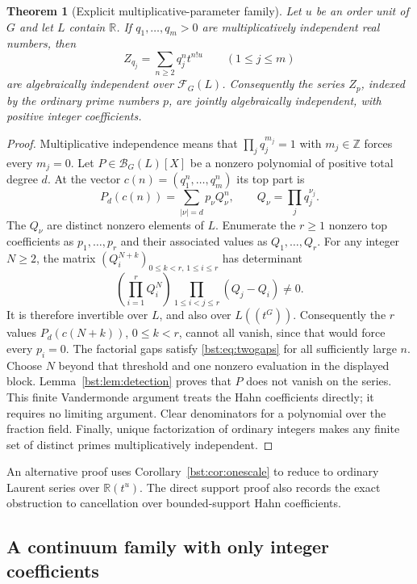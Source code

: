 \documentclass[11pt,letterpaper]{article}
\newtheorem{theorem}{Theorem}[section]
\theoremstyle{definition}
\theoremstyle{remark}
\newcommand{\R}{\mathbb R}
\newcommand{\Z}{\mathbb Z}
\newcommand{\HH}[2]{#1((t^{#2}))}
\newcommand{\BB}[2]{\mathcal B_{#2}(#1)}
\newcommand{\FF}[2]{\mathcal F_{#2}(#1)}
\begin{document}
\begin{theorem}[Explicit multiplicative-parameter family]\label{bst:thm:explicit}
Let $u$ be an order unit of $G$ and let $L$ contain $\R$. If
$q_1,\ldots,q_m>0$ are multiplicatively independent real numbers, then
\begin{equation}\label{bst:eq:qfamily}
 Z_{q_j}=\sum_{n\ge2}q_j^n t^{n!u}\qquad(1\le j\le m)
\end{equation}
are algebraically independent over $\FF LG$. Consequently the series
$Z_p$, indexed by the ordinary prime numbers $p$, are jointly algebraically
independent, with positive integer coefficients.
\end{theorem}
\begin{proof}
Multiplicative independence means that
$\prod_jq_j^{m_j}=1$ with $m_j\in\Z$ forces every $m_j=0$.
Let $P\in\BB LG[X]$ be a nonzero polynomial of positive total degree $d$.
At the vector $c(n)=(q_1^n,\ldots,q_m^n)$ its top part is
\[
 P_d(c(n))=\sum_{|\nu|=d}p_\nu Q_\nu^n,
 \qquad Q_\nu=\prod_jq_j^{\nu_j}.
\]
The $Q_\nu$ are distinct nonzero elements of $L$. Enumerate the $r\ge1$
nonzero top coefficients as $p_1,\ldots,p_r$ and their associated
values as $Q_1,\ldots,Q_r$. For any integer $N\ge2$, the matrix
$(Q_i^{N+k})_{0\le k<r,\,1\le i\le r}$ has determinant
\[
 \left(\prod_{i=1}^r Q_i^N\right)
 \prod_{1\le i<j\le r}(Q_j-Q_i)\ne0.
\]
It is therefore invertible over $L$, and also over $\HH LG$.
Consequently the $r$ values $P_d(c(N+k))$, $0\le k<r$, cannot all
vanish, since that would force every $p_i=0$. The factorial gaps satisfy
\eqref{bst:eq:twogaps} for all sufficiently large $n$. Choose $N$ beyond
that threshold and one nonzero evaluation in the displayed block.
Lemma~\ref{bst:lem:detection} proves that $P$ does not vanish on the series.
This finite Vandermonde argument treats the Hahn coefficients directly;
it requires no limiting argument.
Clear denominators for a polynomial over the fraction field. Finally,
unique factorization of ordinary integers makes any finite set of distinct
primes multiplicatively independent.
\end{proof}

An alternative proof uses Corollary~\ref{bst:cor:onescale} to reduce to
ordinary Laurent series over $\R(t^u)$. The direct support proof also records the exact obstruction to
cancellation over bounded-support Hahn coefficients.

\subsection{A continuum family with only integer coefficients}
\end{document}
